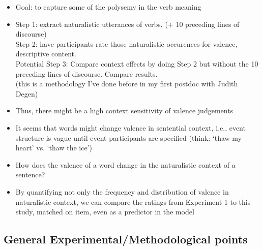 \documentclass[12pt,letterpaper,table,svgnames,dvipsnames]{article}
\begin{document}
\begin{itemize}
    \item Goal: to capture some of the polysemy in the verb meaning

    \item Step 1: extract naturalistic utterances of verbs. (+ 10 preceding lines of discourse)\\
    Step 2: have participants rate those naturalistic occurences for valence, descriptive content.\\
    Potential Step 3: Compare context effects by doing Step 2 but without the 10 preceding lines of discourse. Compare results.\\ 
    (this is a methodology I've done before in my first postdoc with Judith Degen)

    \item Thus, there might be a high context sensitivity of valence judgements




    \item It seems that words might change valence in sentential context, i.e., event structure is vague until event participants are specified (think: `thaw my heart' vs. `thaw the ice')
    

    \item How does the valence of a word change in the naturalistic context of a sentence?

    \item By quantifying not only the frequency and distribution of valence in naturalistic context, we can compare the ratings from Experiment 1 to this study, matched on item, even as a predictor in the model

\end{itemize}



\subsection{General Experimental/Methodological points}
\end{document}
